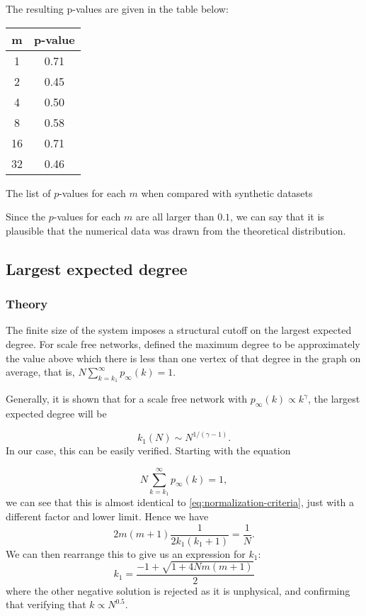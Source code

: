 The resulting p-values are given in the table below:
\begin{center}
\begin{tabular}{ c | c }
 m &  p-value\\ 
 \hline
 1 & 0.71 \\  
 2 & 0.45 \\
 4 & 0.50 \\
 8 & 0.58 \\
 16 & 0.71 \\
 32 & 0.46 \\  
\end{tabular}
\caption{The list of $p$-values for each $m$ when compared with synthetic datasets}
\label{table:ks-test-all}
\end{center}

Since the $p$-values for each $m$ are all larger than $0.1$, we can say that it is plausible that the numerical data was drawn from the theoretical distribution. 

\subsection{Largest expected degree}
\subsubsection{Theory}
The finite size of the system imposes a structural cutoff on the largest expected degree. For scale free networks, \citet{Aiello2001a} defined the maximum degree to be approximately the value above which there is less than one vertex of that degree in the graph on average, that is, $N \sum_{k = k_1}^\infty p_\infty(k) = 1$. 

Generally, it is shown \citep{Boguna2004} that for a scale free network with $p_{\infty}(k) \propto k^{\gamma}$, the largest expected degree will be

\begin{equation}
	k_1(N) \sim N^{1 / (\gamma -1)}.
	\label{eq:largest-expected-degree-research}
\end{equation}
In our case, this can be easily verified. Starting with the equation 

\begin{equation}
	N \sum_{k=k_1}^\infty p_{\infty}(k) = 1, 
	\label{eq:largest-expected-degree-criteria}
\end{equation}
we can see that this is almost identical to \autoref{eq:normalization-criteria}, just with a different factor and lower limit. Hence we have 
\begin{equation}
	2m(m+1) \frac{1}{2k_1(k_1+1)} = \frac{1}{N}.
	\label{eq:largest-expected-degree-derivation}
\end{equation}
We can then rearrange this to give us an expression for $k_1$:
\begin{equation}
	k_1 = \frac{-1 + \sqrt{1 + 4Nm(m+1)}}{2}
	\label{eq:k1-expression}
\end{equation}
where the other negative solution is rejected as it is unphysical, and confirming that verifying that $k \propto N^{0.5}$. 

